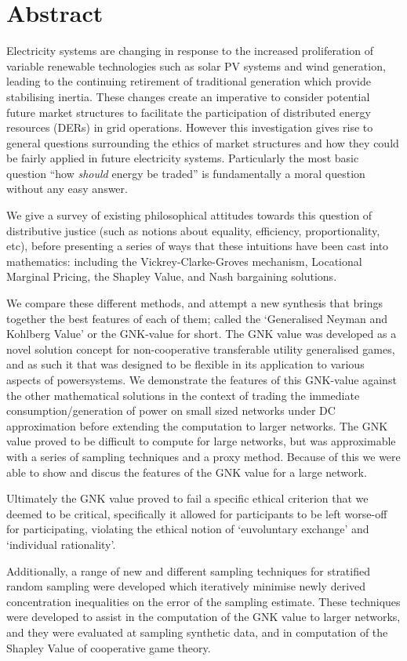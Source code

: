 \chapter*{Abstract}
\vspace{-1em}


Electricity systems are changing in response to the increased proliferation of variable renewable technologies such as solar PV systems and wind generation, leading to the continuing retirement of traditional generation which provide stabilising inertia.
These changes create an imperative to consider potential future market structures to facilitate the participation of distributed energy resources (DERs) in grid operations.
However this investigation gives rise to general questions surrounding the ethics of market structures and how they could be fairly applied in future electricity systems. Particularly the most basic question ``how \textit{should} energy be traded'' is fundamentally a moral question without any easy answer.

We give a survey of existing philosophical attitudes towards this question of distributive justice (such as notions about equality, efficiency, proportionality, etc), before presenting a series of ways that these intuitions have been cast into mathematics: including the Vickrey-Clarke-Groves mechanism, Locational Marginal Pricing, the Shapley Value, and Nash bargaining solutions.

We compare these different methods, and attempt a new synthesis that brings together the best features of each of them; called the `Generalised Neyman and Kohlberg Value' or the GNK-value for short.
The GNK value was developed as a novel solution concept for non-cooperative transferable utility generalised games, and as such it that was designed to be flexible in its application to various aspects of powersystems.
We demonstrate the features of this GNK-value against the other mathematical solutions in the context of trading the immediate consumption/generation of power on small sized networks under DC approximation before extending the computation to larger networks.
The GNK value proved to be difficult to compute for large networks, but was approximable with a series of sampling techniques and a proxy method.
Because of this we were able to show and discus the features of the GNK value for a large network.

Ultimately the GNK value proved to fail a specific ethical criterion that we deemed to be critical, specifically it allowed for participants to be left worse-off for participating, violating the ethical notion of `euvoluntary exchange' and `individual rationality'.

Additionally, a range of new and different sampling techniques for stratified random sampling were developed which iteratively minimise newly derived concentration inequalities on the error of the sampling estimate.
These techniques were developed to assist in the computation of the GNK value to larger networks, and they were evaluated at sampling synthetic data, and in computation of the Shapley Value of cooperative game theory.



